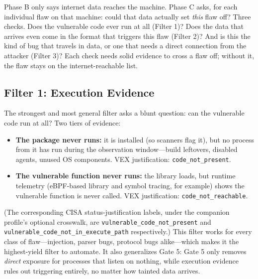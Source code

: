 \documentclass[11pt]{article}
\newcommand{\code}[1]{\texttt{#1}}
\begin{document}
\begin{plain}
Phase B only says internet data reaches the machine. Phase C asks, for each individual flaw on that machine: could that data actually set \emph{this} flaw off? Three checks. Does the vulnerable code ever run at all (Filter 1)? Does the data that arrives even come in the format that triggers this flaw (Filter 2)? And is this the kind of bug that travels in data, or one that needs a direct connection from the attacker (Filter 3)? Each check needs solid evidence to cross a flaw off; without it, the flaw stays on the internet-reachable list.
\end{plain}

\subsection{Filter 1: Execution Evidence}
The strongest and most general filter asks a blunt question: can the vulnerable code run at all? Two tiers of evidence:
\begin{itemize}[leftmargin=1.5em, nosep]
\item \textbf{The package never runs:} it is installed (so scanners flag it), but no process from it has run during the observation window---build leftovers, disabled agents, unused OS components. VEX justification: \code{code\_not\_present}.
\item \textbf{The vulnerable function never runs:} the library loads, but runtime telemetry (eBPF-based library and symbol tracing, for example) shows the vulnerable function is never called. VEX justification: \code{code\_not\_reachable}.
\end{itemize}
(The corresponding CISA status-justification labels, under the companion profile's optional crosswalk, are \code{vulnerable\_code\_not\_present} and \code{vulnerable\_code\_not\_in\_execute\_path} respectively.)
This filter works for every class of flaw---injection, parser bugs, protocol bugs alike---which makes it the highest-yield filter to automate. It also generalizes Gate 5: Gate 5 only removes \emph{direct} exposure for processes that listen on nothing, while execution evidence rules out triggering entirely, no matter how tainted data arrives.
\end{document}
